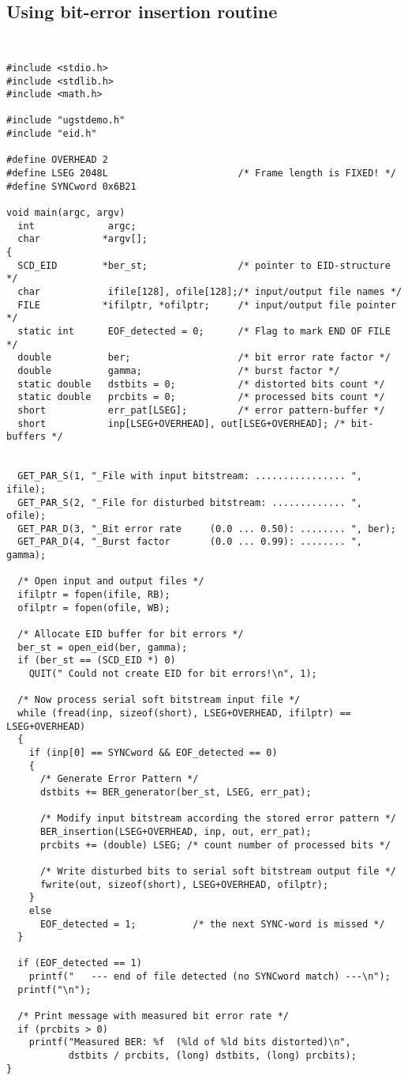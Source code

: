 \subsection {Using bit-error insertion routine}
{\tt\small
\begin{verbatim}
#include <stdio.h>
#include <stdlib.h>
#include <math.h>

#include "ugstdemo.h"
#include "eid.h"

#define OVERHEAD 2
#define LSEG 2048L                       /* Frame length is FIXED! */
#define SYNCword 0x6B21

void main(argc, argv)
  int             argc;
  char           *argv[];
{
  SCD_EID        *ber_st;                /* pointer to EID-structure */
  char            ifile[128], ofile[128];/* input/output file names */
  FILE           *ifilptr, *ofilptr;     /* input/output file pointer */
  static int      EOF_detected = 0;      /* Flag to mark END OF FILE */
  double          ber;                   /* bit error rate factor */
  double          gamma;                 /* burst factor */
  static double   dstbits = 0;           /* distorted bits count */
  static double   prcbits = 0;           /* processed bits count */
  short           err_pat[LSEG];         /* error pattern-buffer */
  short           inp[LSEG+OVERHEAD], out[LSEG+OVERHEAD]; /* bit-buffers */


  GET_PAR_S(1, "_File with input bitstream: ................ ", ifile);
  GET_PAR_S(2, "_File for disturbed bitstream: ............. ", ofile);
  GET_PAR_D(3, "_Bit error rate     (0.0 ... 0.50): ........ ", ber);
  GET_PAR_D(4, "_Burst factor       (0.0 ... 0.99): ........ ", gamma);

  /* Open input and output files */
  ifilptr = fopen(ifile, RB);
  ofilptr = fopen(ofile, WB);

  /* Allocate EID buffer for bit errors */
  ber_st = open_eid(ber, gamma);
  if (ber_st == (SCD_EID *) 0)
    QUIT(" Could not create EID for bit errors!\n", 1);

  /* Now process serial soft bitstream input file */
  while (fread(inp, sizeof(short), LSEG+OVERHEAD, ifilptr) == LSEG+OVERHEAD)
  {
    if (inp[0] == SYNCword && EOF_detected == 0)
    {
      /* Generate Error Pattern */
      dstbits += BER_generator(ber_st, LSEG, err_pat);

      /* Modify input bitstream according the stored error pattern */
      BER_insertion(LSEG+OVERHEAD, inp, out, err_pat);
      prcbits += (double) LSEG; /* count number of processed bits */

      /* Write disturbed bits to serial soft bitstream output file */
      fwrite(out, sizeof(short), LSEG+OVERHEAD, ofilptr);
    }
    else
      EOF_detected = 1;          /* the next SYNC-word is missed */
  }

  if (EOF_detected == 1)
    printf("   --- end of file detected (no SYNCword match) ---\n");
  printf("\n");

  /* Print message with measured bit error rate */
  if (prcbits > 0)
    printf("Measured BER: %f  (%ld of %ld bits distorted)\n",
           dstbits / prcbits, (long) dstbits, (long) prcbits);
}
\end{verbatim}
}


